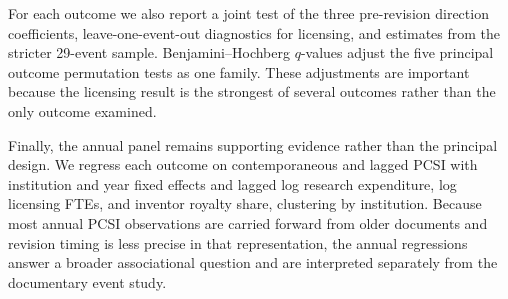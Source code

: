 For each outcome we also report a joint test of the three pre-revision direction coefficients, leave-one-event-out diagnostics for licensing, and estimates from the stricter 29-event sample. Benjamini--Hochberg $q$-values adjust the five principal outcome permutation tests as one family. These adjustments are important because the licensing result is the strongest of several outcomes rather than the only outcome examined.

Finally, the annual panel remains supporting evidence rather than the principal design. We regress each outcome on contemporaneous and lagged PCSI with institution and year fixed effects and lagged log research expenditure, log licensing FTEs, and inventor royalty share, clustering by institution. Because most annual PCSI observations are carried forward from older documents and revision timing is less precise in that representation, the annual regressions answer a broader associational question and are interpreted separately from the documentary event study.
